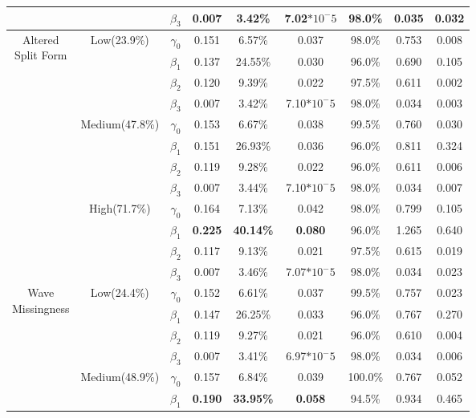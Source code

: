 \documentclass{svjour3}                     %
\begin{document}
\begin{table}[p]
\begin{tabular}{c|c|c|cccccc}
		&& $\beta_3$ & 0.007 & 3.42\% & 7.02$*10^-5$ & 98.0\% & 0.035 & 0.032 \\
		\midrule
		\midrule
		\multirow{12}{*}{\parbox{1.75cm}{Altered \\ Split Form}}
		& \multirow{4}{*}{Low(23.9\%)}
		& $\gamma_0$ & 0.151 & 6.57\% & 0.037 & 98.0\% & 0.753 & 0.008 \\
		&& $\beta_1$ & 0.137 & 24.55\% & 0.030 & 96.0\% & 0.690 & 0.105 \\
		&& $\beta_2$ & 0.120 & 9.39\% & 0.022 & 97.5\% & 0.611 & 0.002 \\
		&& $\beta_3$ & 0.007 & 3.42\% & 7.10$*10^-5$ & 98.0\% & 0.034 & 0.003 \\ \cline{2-9} \noalign{\smallskip}
		&\multirow{4}{*}{Medium(47.8\%)}
		& $\gamma_0$ & 0.153 & 6.67\% & 0.038 & 99.5\% & 0.760 & 0.030 \\
		&& $\beta_1$ & 0.151 & 26.93\% & 0.036 & 96.0\% & 0.811 & 0.324 \\
		&& $\beta_2$ & 0.119 & 9.28\% & 0.022 & 96.0\% & 0.611 & 0.006 \\
		&& $\beta_3$ & 0.007 & 3.44\% & 7.10$*10^-5$ & 98.0\% & 0.034 & 0.007 \\ \cline{2-9} \noalign{\smallskip}
		& \multirow{4}{*}{High(71.7\%)}
		& $\gamma_0$ & 0.164 & 7.13\% & 0.042 & 98.0\% & 0.799 & 0.105 \\
		&& $\beta_1$ & \textbf{0.225} & \textbf{40.14\%} & \textbf{0.080} & 96.0\% & 1.265 & 0.640 \\
		&& $\beta_2$ & 0.117 & 9.13\% & 0.021 & 97.5\% & 0.615 & 0.019 \\
		&& $\beta_3$ & 0.007 & 3.46\% & 7.07$*10^-5$ & 98.0\% & 0.034 & 0.023 \\
		\midrule
		\midrule
		\multirow{12}{*}{\parbox{1.75cm}{Wave \\ Missingness}}
		& \multirow{4}{*}{Low(24.4\%)}
		& $\gamma_0$ & 0.152 & 6.61\% & 0.037 & 99.5\% & 0.757 & 0.023 \\
		&& $\beta_1$ & 0.147 & 26.25\% & 0.033 & 96.0\% & 0.767 & 0.270 \\
		&& $\beta_2$ & 0.119 & 9.27\% & 0.021 & 96.0\% & 0.610 & 0.004 \\
		&& $\beta_3$ & 0.007 & 3.41\% & 6.97$*10^-5$ & 98.0\% & 0.034 & 0.006 \\ \cline{2-9} \noalign{\smallskip}
		&\multirow{4}{*}{Medium(48.9\%)}
		& $\gamma_0$ & 0.157 & 6.84\% & 0.039 & 100.0\% & 0.767 & 0.052 \\
		&& $\beta_1$ & \textbf{0.190} & \textbf{33.95\%} & \textbf{0.058} & 94.5\% & 0.934 & 0.465 \\

\end{tabular}
\end{table}
\end{document}
